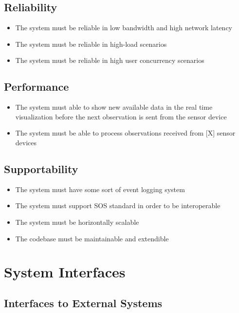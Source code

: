 \subsection{Reliability}

\begin{itemize}
	\item The system must be reliable in low bandwidth and high network latency
	\item The system must be reliable in high-load scenarios
	\item The system must be reliable in high user concurrency scenarios
\end{itemize}

\subsection{Performance}

\begin{itemize}
	\item The system must able to show new available data in the real time visualization before the next observation is sent from the sensor device
	\item The system must be able to process observations received from [X] sensor devices
\end{itemize}

\subsection{Supportability}

\begin{itemize}
	\item The system must have some sort of event logging system
	\item The system must support SOS standard in order to be interoperable
	\item The system must be horizontally scalable
	\item The codebase must be maintainable and extendible
\end{itemize}

\section{System Interfaces}

\subsection{Interfaces to External Systems}

